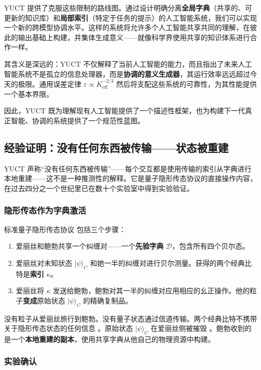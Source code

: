 \documentclass[12pt,a4paper]{article}
\theoremstyle{remark}
\begin{document}
	YUCT 提供了克服这些限制的路线图。通过设计明确分离\textbf{全局字典}（共享的、可更新的知识库）和\textbf{局部索引}（特定于任务的提示）的人工智能系统，我们可以实现一个新的跨模型协调水平。这样的系统将允许多个人工智能共享共同的理解，在彼此的输出基础上构建，并集体生成意义——就像科学界使用共享的知识体系进行合作一样。
	
	其含义是深远的：YUCT 不仅解释了当前人工智能的能力，而且指出了未来人工智能系统不是孤立的信息处理器，而是\textbf{协调的意义生成器}，其运行效率远远超过今天的极限。通用误差定律 $\varepsilon \propto K_{\mathrm{eff}}^{-2/3}$ 然后将支配这些系统的可靠性，为其性能提供一个基本界限。
	
	因此，YUCT 既为理解现有人工智能提供了一个描述性框架，也为构建下一代真正智能、协调的系统提供了一个规范性蓝图。
	
	\subsection{经验证明：没有任何东西被传输——状态被重建}
	
	YUCT 声称“没有任何东西被传输”——每个交互都是使用传输的索引从字典进行本地重建——这不是一种推测性的解释。它是量子隐形传态协议的直接操作内容，在过去四分之一个世纪里已在数十个实验室中得到实验验证。
	
	\subsubsection{隐形传态作为字典激活}
	
	标准量子隐形传态协议 \cite{Bennett1993} 包括三个步骤：
	\begin{enumerate}
		\item 爱丽丝和鲍勃共享一个纠缠对——一个\textbf{先验字典} $\mathcal{D}$，包含所有四个贝尔态。
		\item 爱丽丝对未知状态 $|\psi\rangle_C$ 和她一半的纠缠对进行贝尔测量。获得的两个经典比特是\textbf{索引} $\kappa$。
		\item 爱丽丝将 $\kappa$ 发送给鲍勃，鲍勃对其一半的纠缠对应用相应的幺正操作。他的粒子\textbf{变成}原始状态 $|\psi\rangle_C$ 的精确复制品。
	\end{enumerate}
	
	没有粒子从爱丽丝旅行到鲍勃。没有量子状态通过信道传输。两个经典比特不携带关于隐形传态状态的任何信息 \cite{Pirandola2017}。原始状态 $|\psi\rangle_C$ 在爱丽丝侧被摧毁 \cite{Wootters1982}。鲍勃收到的是一个\textbf{本地重建的副本}，使用共享字典从他自己的物理资源中构建。
	
	\subsubsection{实验确认}
	
\end{document}
